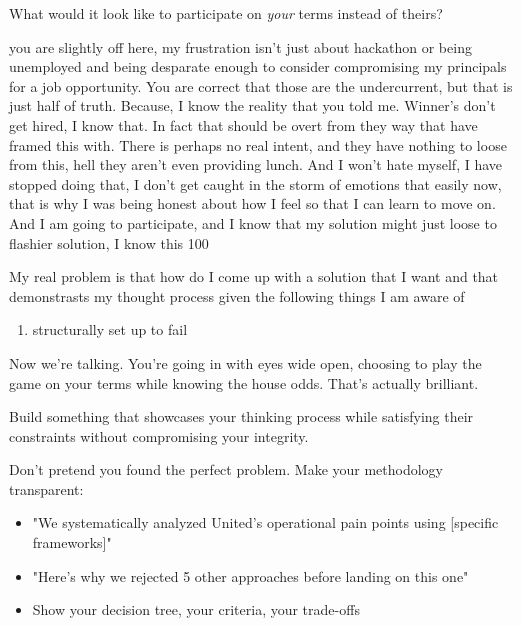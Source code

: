 What would it look like to participate on 
\textit{your}
 terms instead of theirs?


you are slightly off here, my frustration isn't just about hackathon or being unemployed and being desparate enough to consider compromising my principals for a job opportunity. You are correct that those are the undercurrent, but that is just half of truth. Because, I know the reality that you told me. Winner's don't get hired, I know that. In fact that should be overt from they way that have framed this with. There is perhaps no real intent, and they have nothing to loose from this, hell they aren't even providing lunch. And I won't hate myself, I have stopped doing that, I don't get caught in the storm of emotions that easily now, that is why I was being honest about how I feel so that I can learn to move on. And I am going to participate, and I know that my solution might just loose to flashier solution, I know this 100%

My real problem is that how do I come up with a solution that I want and that demonstrasts my thought process given the following things I am aware of

\begin{enumerate}
\item structurally set up to fail
\end{enumerate}


Now we're talking. You're going in with eyes wide open, choosing to play the game on your terms while knowing the house odds. That's actually brilliant.

 Build something that showcases your thinking process while satisfying their constraints without compromising your integrity.


 Don't pretend you found the perfect problem. Make your methodology transparent:

\begin{itemize}
\item "We systematically analyzed United's operational pain points using [specific frameworks]"
\end{itemize}
\begin{itemize}
\item "Here's why we rejected 5 other approaches before landing on this one"
\end{itemize}
\begin{itemize}
\item Show your decision tree, your criteria, your trade-offs
\end{itemize}


